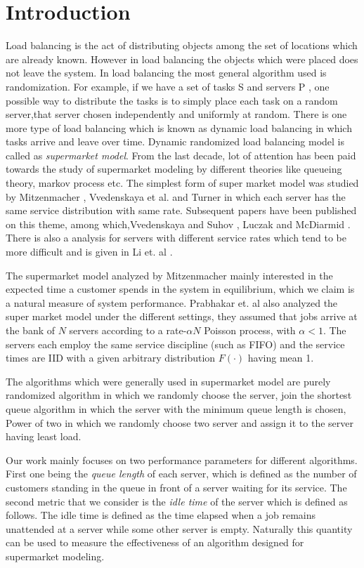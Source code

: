 \documentclass[a4paper,english,11pt]{article}
\begin{document}
\section{Introduction}
Load balancing is the act of distributing objects among the set of locations which are already known. However in load balancing the objects which were placed does not leave the system. In load balancing the most general algorithm used is randomization. For example, if we have a set of tasks S and servers P , one possible way to distribute the tasks is to simply place each task on a random server,that server chosen independently and uniformly at random. There is one more type of load balancing which is known as dynamic load balancing in which tasks arrive and leave over time. Dynamic randomized load balancing model is called as \textit{supermarket model}.
From the last decade, lot of attention has been paid towards the study of supermarket modeling by different theories like queueing theory, markov process etc. The simplest form of super market model was studied by Mitzenmacher \cite{Mitzenmacher}, Vvedenskaya et al.\cite{Vv} and Turner \cite{Turner} in which  each server has the same service distribution with same rate. Subsequent papers have been published on this theme, among which,Vvedenskaya and Suhov \cite{VvSu}, Luczak and McDiarmid \cite{Luczak}. There is also a analysis for servers with different service rates which tend to be more difficult and is given in Li et. al \cite{Li}.
\par The supermarket model analyzed by Mitzenmacher mainly  interested in the expected time a customer spends in the system in equilibrium, which we claim is a natural measure of system performance. Prabhakar et. al \cite{Prabhakar} also analyzed the super market model under the different settings, they assumed that jobs arrive at the bank of $N$ servers according to a rate-$\alpha N$ Poisson
process, with $\alpha < 1$. The servers each employ the same service discipline (such as FIFO) and the service times are IID with a given arbitrary distribution $F(·)$ having mean 1.
\par The algorithms which were generally used in supermarket model are purely randomized algorithm in which we randomly choose the server, join the shortest queue algorithm in which the server with the minimum queue length is chosen, Power of two in which we randomly choose two server and assign it to the server having least load.
\par Our work mainly focuses on two performance parameters for different algorithms. First one being the \textit{queue length} of each server, which is defined as the number of customers standing in the queue in front of a server waiting for its service. The second metric that we consider is the \textit{idle time} of the server which is defined as follows. The idle time is defined as the time elapsed when a job remains unattended at a server while some other server is empty. Naturally this quantity can be used to measure the effectiveness of an algorithm designed for supermarket modeling. 
\end{document}
